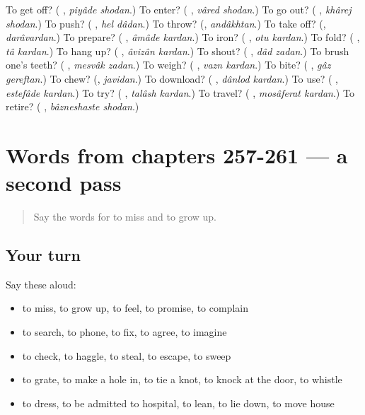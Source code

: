 \begin{tcolorbox}[breakable,colback=teal!4,colframe=teal!35!black,title={Before you move on}]
To get off? (\textbf{ }, \emph{piyâde shodan}.) To enter? (\textbf{ }, \emph{vâred shodan}.) To go out? (\textbf{ }, \emph{khârej shodan}.) To push? (\textbf{ }, \emph{hel dâdan}.) To throw? (\textbf{}, \emph{andâkhtan}.) To take off? (\textbf{}, \emph{darâvardan}.) To prepare? (\textbf{ }, \emph{âmâde kardan}.) To iron? (\textbf{ }, \emph{otu kardan}.) To fold? (\textbf{ }, \emph{tâ kardan}.) To hang up? (\textbf{ }, \emph{âvizân kardan}.) To shout? (\textbf{ }, \emph{dâd zadan}.) To brush one's teeth? (\textbf{ }, \emph{mesvâk zadan}.) To weigh? (\textbf{ }, \emph{vazn kardan}.) To bite? (\textbf{ }, \emph{gâz gereftan}.) To chew? (\textbf{}, \emph{javidan}.) To download? (\textbf{ }, \emph{dânlod kardan}.) To use? (\textbf{ }, \emph{estefâde kardan}.) To try? (\textbf{ }, \emph{talâsh kardan}.) To travel? (\textbf{ }, \emph{mosâferat kardan}.) To retire? (\textbf{ }, \emph{bâzneshaste shodan}.)
\end{tcolorbox}
\section[(dialogue)]{Words from chapters 257-261 — a second pass}

\label{lesson:FA-R261-second-pass-words-from-chapters-257-261}



\begin{quote}
Say the words for to miss and to grow up.
\end{quote}

\subsection*{Your turn}
Say these aloud:

\begin{itemize}
\raggedright
  \item to miss, to grow up, to feel, to promise, to complain
  \item to search, to phone, to fix, to agree, to imagine
  \item to check, to haggle, to steal, to escape, to sweep
  \item to grate, to make a hole in, to tie a knot, to knock at the door, to whistle
  \item to dress, to be admitted to hospital, to lean, to lie down, to move house
\end{itemize}

